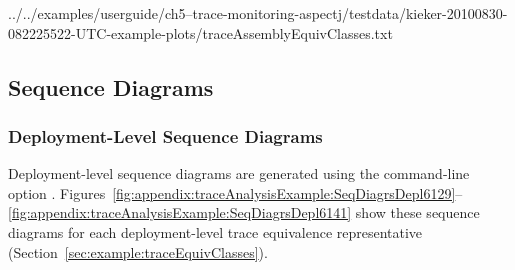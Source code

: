\setTextListing
%
{../../examples/userguide/ch5--trace-monitoring-aspectj/testdata/kieker-20100830-082225522-UTC-example-plots/traceAssemblyEquivClasses.txt}

\pagebreak

\subsection{Sequence Diagrams}\label{sec:example:seqDiagrams}%

\subsubsection{Deployment-Level Sequence Diagrams}\label{sec:example:deploymentSeqDiagrams}%

Deployment-level sequence diagrams are generated using the command-line option \OPT{\OPTplotDeploymentSequenceDiagrams}. %
Figures~\ref{fig:appendix:traceAnalysisExample:SeqDiagrsDepl6129}--\ref{fig:appendix:traceAnalysisExample:SeqDiagrsDepl6141} %
show these sequence diagrams for each deployment-level %
trace equivalence representative (Section~\ref{sec:example:traceEquivClasses}).

